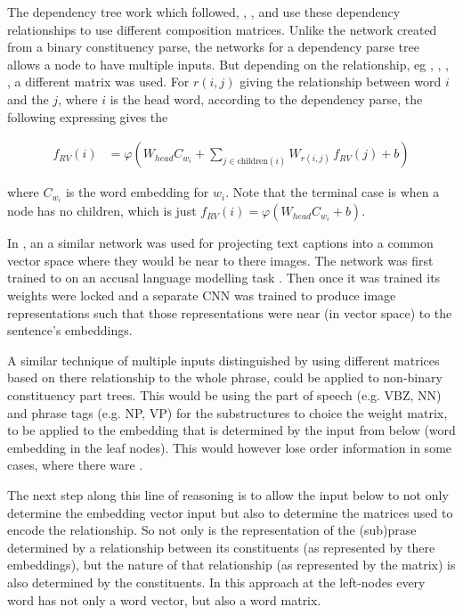 \documentclass[12pt,parskip]{komatufte}
\begin{document}
The dependency tree work which followed, , , and  use these dependency relationships to use different composition matrices.
Unlike the network created from a binary constituency parse, the networks for a dependency parse tree allows a node to have multiple inputs.
But depending on the relationship, eg , , , , a different matrix was used.
For $r(i,j)$ giving the relationship between word $i$ and the $j$, where $i$ is the head word, according to the dependency parse,
the following expressing gives the 

\begin{align}
	f_{RV}(i) &= \varphi\left(W_{head} C_{w_i} + \sum_{j \in \mathrm{children}(i)} W_{r(i,j)} \, f_{RV}(j) + b \right)
\end{align}

where $C_{w_i}$ is the word embedding for $w_i$.
Note that the terminal case is when a node has no children, which is just $f_{RV}(i) = \varphi \left( W_{head} C_{w_i} + b \right)$.

In \textcite{socherDTRNN}, an a similar network was used for projecting text captions into a common vector space where they would be near to there images.
The network was first trained to on an accusal language modelling task .
Then once it was trained its weights were locked and a separate CNN was trained to produce image representations such that those representations were near (in vector space) to the sentence's embeddings.


A similar technique of multiple inputs distinguished by using different matrices based on there relationship to the whole phrase,
 could be applied to non-binary constituency part trees.
This would be using the part of speech (e.g. VBZ, NN) and phrase tags (e.g. NP, VP) for the substructures to choice the weight matrix, to be applied to the embedding that is determined by the input from below (word embedding in the leaf nodes).
This would however lose order information in some cases, where there ware .

The next step along this line of reasoning is to allow the input below to not only determine the embedding vector input but also to determine the matrices used to encode the relationship.
So not only is the representation of the (sub)prase determined by a relationship between  its constituents (as represented by there embeddings),
but the nature of that relationship (as represented by the matrix) is also determined by the constituents.
In this approach at the left-nodes every word has not only a word vector, but also a word matrix.
\end{document}
